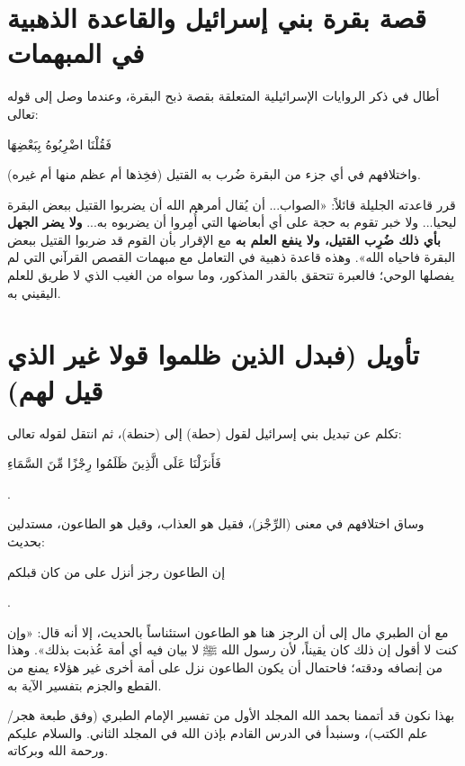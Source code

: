 \separator

\section{قصة بقرة بني إسرائيل والقاعدة الذهبية في المبهمات}
أطال  في ذكر الروايات الإسرائيلية المتعلقة بقصة ذبح البقرة، وعندما وصل إلى قوله تعالى: \begin{ayah}فَقُلْنَا اضْرِبُوهُ بِبَعْضِهَا\end{ayah} واختلافهم في أي جزء من البقرة ضُرب به القتيل (فخِذها أم عظم منها أم غيره).

\begin{fawaid}
قرر  قاعدته الجليلة قائلاً: «الصواب... أن يُقال أمرهم الله أن يضربوا القتيل ببعض البقرة ليحيا... ولا خبر تقوم به حجة على أي أبعاضها التي أُمِروا أن يضربوه به... \textbf{ولا يضر الجهل بأي ذلك ضُرِب القتيل، ولا ينفع العلم به} مع الإقرار بأن القوم قد ضربوا القتيل ببعض البقرة فاحياه الله». وهذه قاعدة ذهبية في التعامل مع مبهمات القصص القرآني التي لم يفصلها الوحي؛ فالعبرة تتحقق بالقدر المذكور، وما سواه من الغيب الذي لا طريق للعلم اليقيني به.
\end{fawaid}

\separator

\section{تأويل (فبدل الذين ظلموا قولا غير الذي قيل لهم)}
تكلم  عن تبديل بني إسرائيل لقول (حطة) إلى (حنطة)، ثم انتقل لقوله تعالى: \begin{ayah}فَأَنزَلْنَا عَلَى الَّذِينَ ظَلَمُوا رِجْزًا مِّنَ السَّمَاءِ\end{ayah}.

وساق اختلافهم في معنى (الرِّجْز)، فقيل هو العذاب، وقيل هو الطاعون، مستدلين بحديث: \begin{hadith}إن الطاعون رجز أنزل على من كان قبلكم\end{hadith}.

\begin{fawaid}
مع أن الطبري مال إلى أن الرجز هنا هو الطاعون استئناساً بالحديث، إلا أنه قال: «وإن كنت لا أقول إن ذلك كان يقيناً، لأن رسول الله ﷺ لا بيان فيه أي أمة عُذبت بذلك». وهذا من إنصافه ودقته؛ فاحتمال أن يكون الطاعون نزل على أمة أخرى غير هؤلاء يمنع من القطع والجزم بتفسير الآية به.
\end{fawaid}

\separator

بهذا نكون قد أتممنا بحمد الله المجلد الأول من تفسير الإمام الطبري (وفق طبعة هجر/علم الكتب)، وسنبدأ في الدرس القادم بإذن الله في المجلد الثاني. والسلام عليكم ورحمة الله وبركاته.
